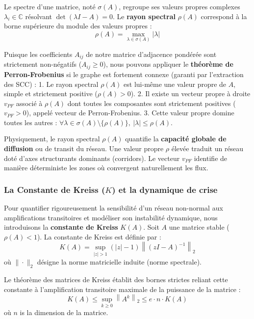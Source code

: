 \documentclass[11pt, a4paper]{article}
\begin{document}
Le spectre d'une matrice, noté \(\sigma(A)\), regroupe ses valeurs
propres complexes \(\lambda_i \in \mathbb{C}\) résolvant
\(\det(\lambda I - A) = 0\). Le \textbf{rayon spectral} \(\rho(A)\)
correspond à la borne supérieure du module des valeurs propres :
\[\rho(A) = \max_{\lambda \in \sigma(A)} |\lambda|\]

Puisque les coefficients \(A_{ij}\) de notre matrice d'adjacence
pondérée sont strictement non-négatifs (\(A_{ij} \ge 0\)), nous pouvons
appliquer le \textbf{théorème de Perron-Frobenius} si le graphe est
fortement connexe (garanti par l'extraction des SCC) : 1. Le rayon
spectral \(\rho(A)\) est lui-même une valeur propre de \(A\), simple et
strictement positive (\(\rho(A) > 0\)). 2. Il existe un vecteur propre à
droite \(v_{PF}\) associé à \(\rho(A)\) dont toutes les composantes sont
strictement positives (\(v_{PF} > 0\)), appelé vecteur de
Perron-Frobenius. 3. Cette valeur propre domine toutes les autres :
\(\forall \lambda \in \sigma(A) \setminus \{\rho(A)\}, \ |\lambda| \le \rho(A)\).

Physiquement, le rayon spectral \(\rho(A)\) quantifie la
\textbf{capacité globale de diffusion} ou de transit du réseau. Une
valeur propre \(\rho\) élevée traduit un réseau doté d'axes structurants
dominants (corridors). Le vecteur \(v_{PF}\) identifie de manière
déterministe les zones où convergent naturellement les flux.

\subsubsection{\texorpdfstring{La Constante de Kreiss (\(K\)) et la
dynamique de
crise}{La Constante de Kreiss (K) et la dynamique de crise}}\label{la-constante-de-kreiss-k-et-la-dynamique-de-crise}

Pour quantifier rigoureusement la sensibilité d'un réseau non-normal aux
amplifications transitoires et modéliser son instabilité dynamique, nous
introduisons la \textbf{constante de Kreiss} \(K(A)\). Soit \(A\) une
matrice stable (\(\rho(A) < 1\)). La constante de Kreiss est définie par
: \[K(A) = \sup_{|z| > 1} (|z| - 1) \left\| (zI - A)^{-1} \right\|_2\]
où \(\|\cdot\|_2\) désigne la norme matricielle induite (norme
spectrale).

Le théorème des matrices de Kreiss établit des bornes strictes reliant
cette constante à l'amplification transitoire maximale de la puissance
de la matrice :
\[K(A) \le \sup_{k \ge 0} \left\| A^k \right\|_2 \le e \cdot n \cdot K(A)\]
où \(n\) is la dimension de la matrice.
\end{document}
